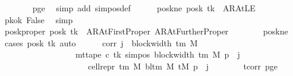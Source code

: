 \begin{isabellebody}
\ \ \ \ \ \ \isamarkupfalse%
\ pge{}\ \isamarkupfalse%
\ {\isacharparenleft}{\kern0pt}simp\ add{\isacharcolon}{\kern0pt}\ sim{\isacharunderscore}{\kern0pt}pos{\isacharunderscore}{\kern0pt}def{\isacharparenright}{\kern0pt}\isanewline
\ \ \ \ \isamarkupfalse%
\ posk{\isacharunderscore}{\kern0pt}ne{\isacharcolon}{\kern0pt}\ {\isachardoublequoteopen}posk\ tk\ {\isasymnoteq}\ AR{\isacharunderscore}{\kern0pt}AtLE{\isachardoublequoteclose}\ \isamarkupfalse%
\ pkok\ False\ \isamarkupfalse%
\ simp\isanewline
\ \ \ \ \isamarkupfalse%
\ posk{\isacharunderscore}{\kern0pt}proper{\isacharcolon}{\kern0pt}\ {\isachardoublequoteopen}posk\ tk\ {\isasymin}\ {\isacharbraceleft}{\kern0pt}AR{\isacharunderscore}{\kern0pt}AtFirstProper{\isacharcomma}{\kern0pt}\ AR{\isacharunderscore}{\kern0pt}AtFurtherProper{\isacharbraceright}{\kern0pt}{\isachardoublequoteclose}\isanewline
\ \ \ \ \ \ \isamarkupfalse%
\ posk{\isacharunderscore}{\kern0pt}ne\ \isamarkupfalse%
\ {\isacharparenleft}{\kern0pt}cases\ {\isachardoublequoteopen}posk\ tk{\isachardoublequoteclose}{\isacharparenright}{\kern0pt}\ auto\isanewline
\ \ \ \ \isamarkupfalse%
\ corr{\isacharcolon}{\kern0pt}\ {\isachardoublequoteopen}{\isasymforall}j\ {\isacharless}{\kern0pt}\ block{\isacharunderscore}{\kern0pt}width\ {\isacharparenleft}{\kern0pt}{\isasymGamma}{\isacharunderscore}{\kern0pt}tm\ M{\isacharparenright}{\kern0pt}{\isachardot}{\kern0pt}\isanewline
\ \ \ \ \ \ \ \ \ \ \ \ \ \ \ \ \ \ mt{\isacharunderscore}{\kern0pt}tape\ c{\isacharprime}{\kern0pt}\ tk\ {\isacharparenleft}{\kern0pt}sim{\isacharunderscore}{\kern0pt}pos\ {\isacharparenleft}{\kern0pt}block{\isacharunderscore}{\kern0pt}width\ {\isacharparenleft}{\kern0pt}{\isasymGamma}{\isacharunderscore}{\kern0pt}tm\ M{\isacharparenright}{\kern0pt}{\isacharparenright}{\kern0pt}\ p\ {\isacharplus}{\kern0pt}\ j{\isacharparenright}{\kern0pt}\isanewline
\ \ \ \ \ \ \ \ \ \ \ \ \ \ \ \ \ \ \ \ {\isacharequal}{\kern0pt}\ cell{\isacharunderscore}{\kern0pt}repr\ {\isacharparenleft}{\kern0pt}{\isasymGamma}{\isacharunderscore}{\kern0pt}tm\ M{\isacharparenright}{\kern0pt}\ {\isacharparenleft}{\kern0pt}bl{\isacharunderscore}{\kern0pt}tm\ M{\isacharparenright}{\kern0pt}\ {\isacharparenleft}{\kern0pt}tM\ p{\isacharparenright}{\kern0pt}\ {\isacharbang}{\kern0pt}\ j{\isachardoublequoteclose}\isanewline
\ \ \ \ \ \ \isamarkupfalse%
\ tcorr\ pge{}\ \isamarkupfalse%

\end{isabellebody}
